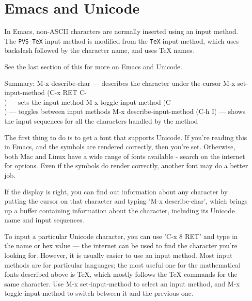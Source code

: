 \section{Emacs and Unicode}

In Emacs, non-ASCII characters are normally inserted using an input
method.  The \texttt{PVS-TeX} input method is modified from the
\texttt{TeX} input method, which uses backslash followed by the character
name, and uses TeX names.

See the last section of this for more on Emacs and Unicode.

Summary:
  M-x describe-char — describes the character under the cursor
  M-x set-input-method (C-x RET C-\\) — sets the input method
  M-x toggle-input-method (C-\\) — toggles between input methods
  M-x describe-input-method (C-h I) — shows the input sequences
         for all the characters handled by the method

The first thing to do is to get a font that supports Unicode.  If you're
reading this in Emacs, and the symbols are rendered correctly, then you're
set.  Otherwise, both Mac and Linux have a wide range of fonts available -
search on the internet for options.  Even if the symbols do render
correctly, another font may do a better job.

If the display is right, you can find out information about any character
by putting the cursor on that character and typing 'M-x describe-char',
which brings up a buffer containing information about the character,
including its Unicode name and input sequences.

To input a particular Unicode character, you can use 'C-x 8 RET' and type in
the name or hex value — the internet can be used to find the character
you're looking for.  However, it is usually easier to use an input
method.  Most input methods are for particular languages; the most useful
one for the mathematical fonts described above is TeX, which mostly
follows the TeX commands for the same character.  Use M-x set-input-method
to select an input method, and M-x toggle-input-method to switch between
it and the previous one.
